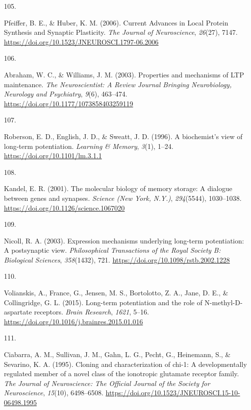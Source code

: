 \documentclass[
  11pt,
  letterpaper,
]{scrreprt}
\newlength{\cslhangindent}
\newlength{\csllabelwidth}
\newenvironment{CSLReferences}[2] %
 {\begin{list}{}{%
  \setlength{\itemindent}{0pt}
  \setlength{\leftmargin}{0pt}
  \setlength{\parsep}{0pt}
  \ifodd #1
   \setlength{\leftmargin}{\cslhangindent}
   \setlength{\itemindent}{-1\cslhangindent}
  \fi
  \setlength{\itemsep}{#2\baselineskip}}}
 {\end{list}}
\newcommand{\CSLLeftMargin}[1]{\parbox[t]{\csllabelwidth}{\strut#1\strut}}
\newcommand{\CSLRightInline}[1]{\parbox[t]{\linewidth - \csllabelwidth}{\strut#1\strut}}
\begin{document}
\begin{CSLReferences}{0}{0}
\CSLLeftMargin{105. }%
\CSLRightInline{Pfeiffer, B. E., \& Huber, K. M. (2006). Current
{Advances} in {Local Protein Synthesis} and {Synaptic Plasticity}.
\emph{The Journal of Neuroscience}, \emph{26}(27), 7147.
\url{https://doi.org/10.1523/JNEUROSCI.1797-06.2006}}

\CSLLeftMargin{106. }%
\CSLRightInline{Abraham, W. C., \& Williams, J. M. (2003). Properties
and mechanisms of {LTP} maintenance. \emph{The Neuroscientist: A Review
Journal Bringing Neurobiology, Neurology and Psychiatry}, \emph{9}(6),
463--474. \url{https://doi.org/10.1177/1073858403259119}}

\CSLLeftMargin{107. }%
\CSLRightInline{Roberson, E. D., English, J. D., \& Sweatt, J. D.
(1996). A biochemist's view of long-term potentiation. \emph{Learning \&
Memory}, \emph{3}(1), 1--24. \url{https://doi.org/10.1101/lm.3.1.1}}

\CSLLeftMargin{108. }%
\CSLRightInline{Kandel, E. R. (2001). The molecular biology of memory
storage: A dialogue between genes and synapses. \emph{Science (New York,
N.Y.)}, \emph{294}(5544), 1030--1038.
\url{https://doi.org/10.1126/science.1067020}}

\CSLLeftMargin{109. }%
\CSLRightInline{Nicoll, R. A. (2003). Expression mechanisms underlying
long-term potentiation: A postsynaptic view. \emph{Philosophical
Transactions of the Royal Society B: Biological Sciences},
\emph{358}(1432), 721. \url{https://doi.org/10.1098/rstb.2002.1228}}

\CSLLeftMargin{110. }%
\CSLRightInline{Volianskis, A., France, G., Jensen, M. S., Bortolotto,
Z. A., Jane, D. E., \& Collingridge, G. L. (2015). Long-term
potentiation and the role of {N-methyl-D-aspartate} receptors.
\emph{Brain Research}, \emph{1621}, 5--16.
\url{https://doi.org/10.1016/j.brainres.2015.01.016}}

\CSLLeftMargin{111. }%
\CSLRightInline{Ciabarra, A. M., Sullivan, J. M., Gahn, L. G., Pecht,
G., Heinemann, S., \& Sevarino, K. A. (1995). Cloning and
characterization of chi-1: A developmentally regulated member of a novel
class of the ionotropic glutamate receptor family. \emph{The Journal of
Neuroscience: The Official Journal of the Society for Neuroscience},
\emph{15}(10), 6498--6508.
\url{https://doi.org/10.1523/JNEUROSCI.15-10-06498.1995}}


\end{CSLReferences}
\end{document}
